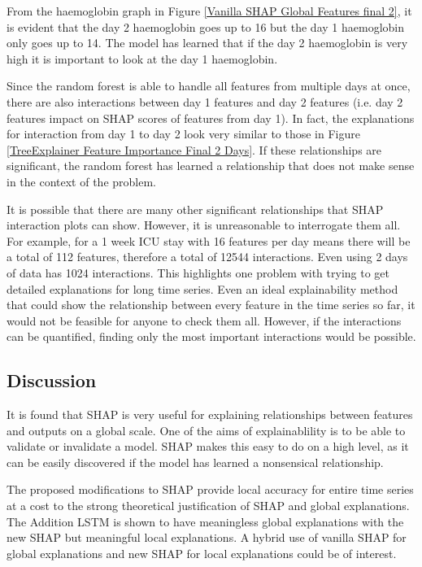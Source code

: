 \documentclass[12pt]{article}
\begin{document}
From the haemoglobin graph in Figure \ref{Vanilla SHAP Global Features final 2}, it is evident that the day 2 haemoglobin goes up to 16 but the day 1 haemoglobin only goes up to 14. The model has learned that if the day 2 haemoglobin is very high it is important to look at the day 1 haemoglobin. 


Since the random forest is able to handle all features from multiple days at once, there are also interactions between day 1 features and day 2 features (i.e. day 2 features impact on SHAP scores of features from day 1). In fact, the explanations for interaction from day 1 to day 2 look very similar to those in Figure \ref{TreeExplainer Feature Importance Final 2 Days}. If these relationships are significant, the random forest has learned a relationship that does not make sense in the context of the problem.

It is possible that there are many other significant relationships that SHAP interaction plots can show. However, it is unreasonable to interrogate them all. For example, for a 1 week ICU stay with 16 features per day means there will be a total of 112 features, therefore a total of 12544 interactions. Even using 2 days of data has 1024 interactions. This highlights one problem with trying to get detailed explanations for long time series. Even an ideal explainability method that could show the relationship between every feature in the time series so far, it would not be feasible for anyone to check them all. However, if the interactions can be quantified, finding only the most important interactions would be possible.

\subsection{Discussion}

It is found that SHAP is very useful for explaining relationships between features and outputs on a global scale. One of the aims of explainablility is to be able to validate or invalidate a model. SHAP makes this easy to do on a high level, as it can be easily discovered if the model has learned a nonsensical relationship. 

The proposed modifications to SHAP provide local accuracy for entire time series at a cost to the strong theoretical justification of SHAP and global explanations. The Addition LSTM is shown to have meaningless global explanations with the new SHAP but meaningful local explanations. A hybrid use of vanilla SHAP for global explanations and new SHAP for local explanations could be of interest.
\end{document}
